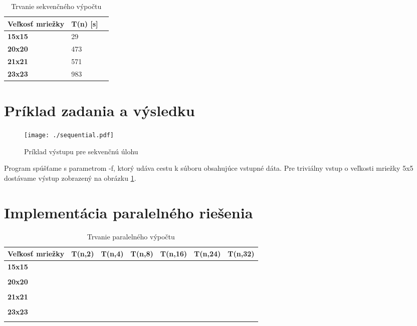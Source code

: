 \documentclass[slovak]{article}
\begin{document}
	\begin{table}\centering
		\begin{tabularx}{\textwidth}{|X|X|X|}
			\hline                        
			\textbf{Veľkosť mriežky} & \textbf{T(n) [s]} \\ \hline
			\textbf{15x15} 	& 29 \\ \hline
			\textbf{20x20} 	& 473 \\ \hline
			\textbf{21x21} 	& 571 \\ \hline
			\textbf{23x23} 	& 983 \\ \hline
		\end{tabularx}
	\caption{Trvanie sekvenčného výpočtu}
	\label{tab:sek}
	\end{table}

\section{Príklad zadania a výsledku}

	\begin{figure}\centering
	\texttt{[image: ./sequential.pdf]}
	\caption{Príklad výstupu pre sekvenčnú úlohu}\label{fig:sek}
	\end{figure}

Program spúšťame s parametrom -f, ktorý udáva cestu k súboru obsahujúce vstupné dáta. Pre triviálny vstup o veľkosti mriežky 5x5 dostávame výstup zobrazený na obrázku \ref{fig:sek}.

\section{Implementácia paralelného riešenia}

	\begin{table}\centering
		\begin{tabularx}{\textwidth}{|X|X|X|X|X|X|X|}
			\hline                        
			\textbf{Veľkosť mriežky} & \textbf{T(n,2)} & \textbf{T(n,4)} & \textbf{T(n,8)} & \textbf{T(n,16)} & \textbf{T(n,24)} & \textbf{T(n,32)} \\ \hline
			\textbf{15x15} 	& & & & & &  \\ \hline
			\textbf 	& & & & & &  \\ \hline
			\textbf{20x20} 	& & & & & &  \\ \hline
			\textbf 	& & & & & &  \\ \hline
			\textbf{21x21} 	& & & & & &  \\ \hline
			\textbf 	& & & & & &  \\ \hline
			\textbf{23x23} 	& & & & & &  \\ \hline
			\textbf 	& & & & & &  \\ \hline
		\end{tabularx}
	\caption{Trvanie paralelného výpočtu}
	\label{tab:par}
	\end{table}
\end{document}

